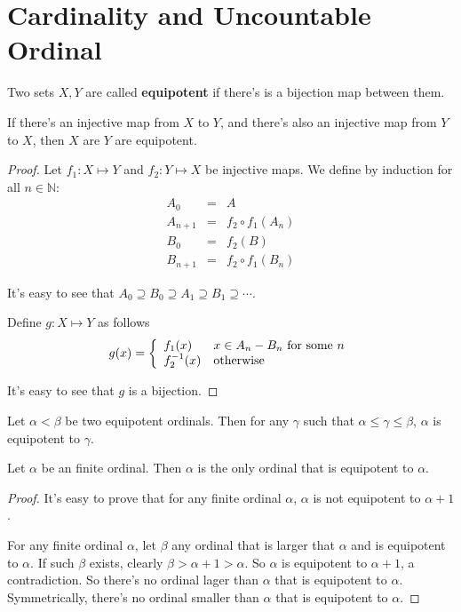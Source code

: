 \documentclass[12pt]{book}
\begin{document}
\section{Cardinality and Uncountable Ordinal}

\begin{definition}
	Two sets $X,Y$ are called {\bf equipotent} if there's is a bijection map between them. 
\end{definition}
\begin{theorem}
	If there's an injective map from $X$ to $Y$, and there's also an injective map from $Y$ to $X$, then $X$ are $Y$ are equipotent.
\end{theorem}
\begin{proof}
	Let $f_1:X\mapsto Y$ and $f_2:Y\mapsto X$ be injective maps. We define by induction for all $n\in \mathbb N$:
	\begin{eqnarray}
		A_0&=&A\\
		A_{n+1}&=&f_2\circ f_1(A_n)\\
		B_0&=&f_2(B)\\
		B_{n+1}&=&f_2\circ f_1(B_n)
	\end{eqnarray}
	
	It's easy to see that $A_0\supseteq B_0\supseteq A_1\supseteq B_1\supseteq \cdots$.
	
	Define $g:X\mapsto Y$ as follows
	\begin{equation}
		g(x)=\left\{\begin{array}{ll}
			f_1(x)&x\in A_n-B_n {\rm\ for\ some\ } n\\
			f_2^{-1}(x)&{\rm otherwise}
		\end{array} \right.
	\end{equation}
	
	It's easy to see that $g$ is a bijection.
\end{proof}

\begin{corollary}
	Let $\alpha<\beta$ be two equipotent ordinals. Then for any $\gamma$ such that $\alpha\leq\gamma\leq\beta$, $\alpha$ is equipotent to $\gamma$.
\end{corollary}

\begin{lemma}
	Let $\alpha$ be an finite ordinal. Then $\alpha$ is the only ordinal that is equipotent to $\alpha$.
\end{lemma}
\begin{proof}
	It's easy to prove that for any finite ordinal $\alpha$, $\alpha$ is not equipotent to $\alpha+1$.

	For any finite ordinal $\alpha$, let $\beta$ any ordinal that is larger that $\alpha$ and is equipotent to $\alpha$. If such $\beta$ exists, clearly $\beta>\alpha+1>\alpha$. So $\alpha$ is equipotent to $\alpha+1$, a contradiction. So there's no ordinal lager than $\alpha$ that is equipotent to $\alpha$. Symmetrically, there's no ordinal smaller than $\alpha$ that is equipotent to $\alpha$.
\end{proof}
\end{document}
